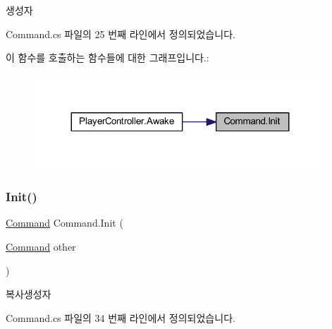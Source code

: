 생성자 



Command.\+cs 파일의 25 번째 라인에서 정의되었습니다.


\begin{DoxyCode}{0}

\end{DoxyCode}
이 함수를 호출하는 함수들에 대한 그래프입니다.\+:\nopagebreak
\begin{figure}[H]
\begin{center}
\leavevmode
\includegraphics[width=311pt]{d5/d6a/class_command_afc8d0350d5935d74a3685f427173d62e_icgraph}
\end{center}
\end{figure}
\mbox{\label{class_command_a4f0000c27196a2cb5f5c3a38ce0ff952}} 
\subsubsection{\texorpdfstring{Init()}{Init()}\hspace{0.1cm}{\footnotesize\ttfamily [2/2]}}
{\footnotesize\ttfamily \mbox{\hyperlink{class_command}{Command}} Command.\+Init (\begin{DoxyParamCaption}\item[{\mbox{\hyperlink{class_command}{Command}}}]{other }\end{DoxyParamCaption})}



복사생성자 



Command.\+cs 파일의 34 번째 라인에서 정의되었습니다.


